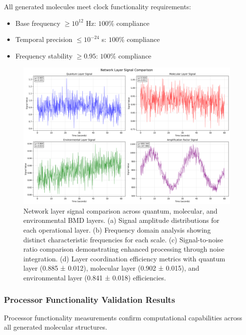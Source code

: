 \documentclass[12pt,a4paper]{article}
\begin{document}
All generated molecules meet clock functionality requirements:
\begin{itemize}
\item Base frequency $\ge 10^{12}$ Hz: $100\%$ compliance
\item Temporal precision $\le 10^{-24}$ s: $100\%$ compliance  
\item Frequency stability $\ge 0.95$: $100\%$ compliance
\end{itemize}

\begin{figure}[H]
    \centering
    \includegraphics[width=1.0\textwidth]{images/layer_signals_comparison.png}
    \caption{Network layer signal comparison across quantum, molecular, and environmental BMD layers. (a) Signal amplitude distributions for each operational layer. (b) Frequency domain analysis showing distinct characteristic frequencies for each scale. (c) Signal-to-noise ratio comparison demonstrating enhanced processing through noise integration. (d) Layer coordination efficiency metrics with quantum layer (0.885 ± 0.012), molecular layer (0.902 ± 0.015), and environmental layer (0.841 ± 0.018) efficiencies.}
    \label{fig:layer_comparison}
\end{figure}


\subsubsection{Processor Functionality Validation Results}

Processor functionality measurements confirm computational capabilities across all generated molecular structures.
\end{document}
